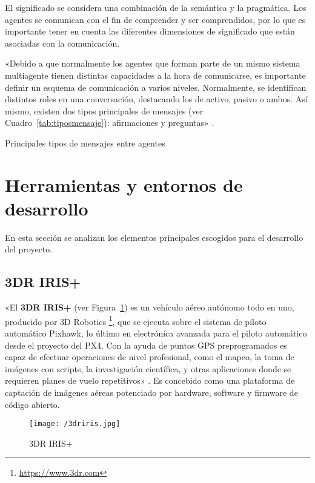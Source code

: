 El significado se considera una combinación de la semántica y la pragmática. Los agentes se comunican con el fin de comprender y ser comprendidos, por lo que es importante tener en cuenta las diferentes dimensiones de significado que están asociadas con la comunicación.

«Debido a que normalmente los agentes que forman parte de un mismo sistema multiagente tienen distintas capacidades a la hora de comunicarse,
es importante definir un esquema de comunicación a varios niveles. Normalmente, se identifican distintos roles en una conversación, destacando los de activo, pasivo o ambos. Así mismo, existen dos tipos principales de mensajes (ver Cuadro~\ref{tab:tiposmensaje}): afirmaciones y preguntas» \cite{coordinacion2}.

\begin{table}[htbp]
  \centering
  {\small
  
  }
  \caption[Principales tipos de mensajes entre agentes]
  {Principales tipos de mensajes entre agentes}
  \label{tab:tiposmensaje}
\end{table}
	
\section{Herramientas y entornos de desarrollo}
\label{sec:herrmientas}

En esta sección se analizan los elementos principales escogidos para el desarrollo del proyecto.

\subsection{3DR IRIS+}
\label{sec:3driris}

«El \textbf{3DR IRIS+} (ver Figura~\ref{fig:3dririsplus}) es un vehículo aéreo autónomo todo en uno, producido por 3D Robotics \footnote{\url{https://www.3dr.com}}, que se ejecuta sobre el sistema de piloto automático Pixhawk, lo último en electrónica avanzada para el piloto automático desde el proyecto del PX4. Con la ayuda de puntos \acs{GPS} preprogramados es capaz de efectuar operaciones de nivel profesional, como el mapeo, la toma de imágenes con scripts, la investigación científica, y otras aplicaciones donde se requieren planes de vuelo repetitivos» \cite{3driris}. Es concebido como una plataforma de captación de imágenes aéreas potenciado por hardware, software y firmware de código abierto.

\begin{figure}[!h]
\begin{center}
\texttt{[image: /3driris.jpg]}
\caption[3DR IRIS+]{3DR IRIS+}
\label{fig:3dririsplus}
\end{center}
\end{figure}


